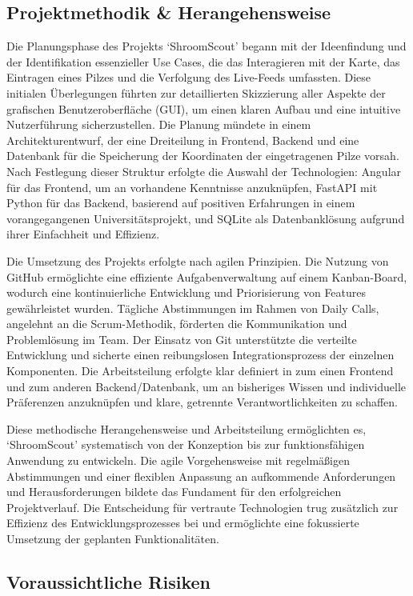 \documentclass[../main.tex]{subfiles} %
\begin{document}
\subsection{Projektmethodik \& Herangehensweise} %

Die Planungsphase des Projekts `ShroomScout' begann mit der Ideenfindung und der Identifikation essenzieller Use Cases,
die das Interagieren mit der Karte, das Eintragen eines Pilzes und die Verfolgung des Live-Feeds umfassten. Diese initialen
Überlegungen führten zur detaillierten Skizzierung aller Aspekte der grafischen Benutzeroberfläche (GUI), um einen klaren
Aufbau und eine intuitive Nutzerführung sicherzustellen. Die Planung mündete in einem Architekturentwurf, der eine Dreiteilung
in Frontend, Backend und eine Datenbank für die Speicherung der Koordinaten der eingetragenen Pilze vorsah. Nach Festlegung
dieser Struktur erfolgte die Auswahl der Technologien: Angular für das Frontend, um an vorhandene Kenntnisse anzuknüpfen,
FastAPI mit Python für das Backend, basierend auf positiven Erfahrungen in einem vorangegangenen Universitätsprojekt, und
SQLite als Datenbanklösung aufgrund ihrer Einfachheit und Effizienz.

Die Umsetzung des Projekts erfolgte nach agilen Prinzipien. Die Nutzung von GitHub ermöglichte eine effiziente Aufgabenverwaltung
auf einem Kanban-Board, wodurch eine kontinuierliche Entwicklung und Priorisierung von Features gewährleistet wurden. Tägliche
Abstimmungen im Rahmen von Daily Calls, angelehnt an die Scrum-Methodik, förderten die Kommunikation und Problemlösung im Team.
Der Einsatz von Git unterstützte die verteilte Entwicklung und sicherte einen reibungslosen Integrationsprozess der einzelnen
Komponenten. Die Arbeitsteilung erfolgte klar definiert in zum einen Frontend und zum anderen Backend/Datenbank, um an bisheriges
Wissen und individuelle Präferenzen anzuknüpfen und klare, getrennte Verantwortlichkeiten zu schaffen.

Diese methodische Herangehensweise und Arbeitsteilung ermöglichten es, `ShroomScout' systematisch von der Konzeption bis zur
funktionsfähigen Anwendung zu entwickeln. Die agile Vorgehensweise mit regelmäßigen Abstimmungen und einer flexiblen Anpassung
an aufkommende Anforderungen und Herausforderungen bildete das Fundament für den erfolgreichen Projektverlauf. Die Entscheidung
für vertraute Technologien trug zusätzlich zur Effizienz des Entwicklungsprozesses bei und ermöglichte eine fokussierte Umsetzung
der geplanten Funktionalitäten.

\subsection{Voraussichtliche Risiken}
\end{document}

